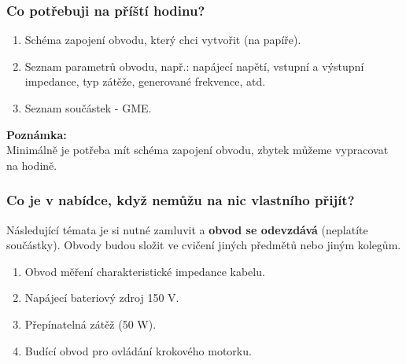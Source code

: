 \documentclass{beamer}
\begin{document}
	\begin{frame}
    \frametitle{Co potřebuji na příští hodinu?}
    
    \begin{enumerate}
      \item Schéma zapojení obvodu, který chci vytvořit (na papíře).
      \item Seznam parametrů obvodu, např.: napájecí napětí, vstupní a výstupní
      impedance, typ zátěže, generované frekvence, atd.
      \item Seznam součástek - GME.
    \end{enumerate}
    
    
    \textbf{Poznámka:} \\
    Minimálně je potřeba mít schéma zapojení obvodu, zbytek můžeme vypracovat na hodině.
	
	\end{frame}
	\begin{frame}
    \frametitle{Co je v nabídce, když nemůžu na nic vlastního přijít?}
    
    Následující témata je si nutné zamluvit a \textbf{obvod se odevzdává} (neplatíte součástky). Obvody budou složit ve cvičení jiných předmětů nebo jiným kolegům.
    
    \begin{enumerate}
      \item Obvod měření charakteristické impedance kabelu.
      \item Napájecí bateriový zdroj 150 V.
      \item Přepínatelná zátěž (50 W).
      \item Budící obvod pro ovládání krokového motorku.
    \end{enumerate}
    
	\end{frame}
\end{document}
